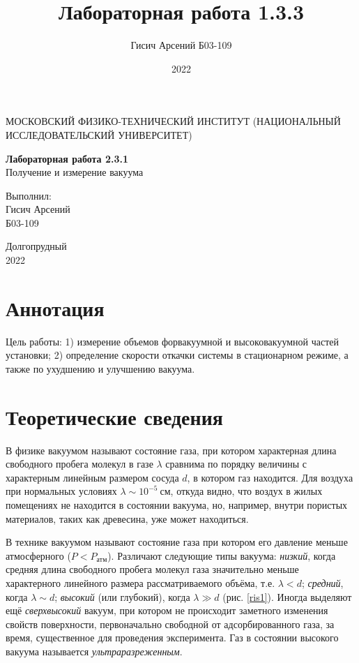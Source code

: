 \documentclass[a4paper, 12pt]{article}
\title{Лабораторная работа 1.3.3}
\author{Гисич Арсений Б03-109}
\date{2022}
\begin{document}
	\begin{center}
		{\large МОСКОВСКИЙ ФИЗИКО-ТЕХНИЧЕСКИЙ ИНСТИТУТ (НАЦИОНАЛЬНЫЙ ИССЛЕДОВАТЕЛЬСКИЙ УНИВЕРСИТЕТ)}
	\end{center}
	\vspace{5 cm}
	{\Large
		\begin{center}
			{\bf Лабораторная работа 2.3.1}\\[0.2 cm]
			Получение и измерение вакуума
		\end{center}
	}
	\vspace{4 cm}
	\begin{flushright}
		{\Large Выполнил: \\
			\vspace{0.2 cm}
			Гисич Арсений \\
			\vspace{0.2 cm}
			Б03-109 \\}
	\end{flushright}
	\vspace{9 cm}
	\begin{center}
		Долгопрудный\\[0.1 cm]
		2022
	\end{center}
\thispagestyle{empty}

\section{Аннотация}

\par Цель работы: 1) измерение объемов форвакуумной и высоковакуумной частей установки; 2) определение скорости откачки системы в стационарном режиме, а также по ухудшению и улучшению вакуума.

\section{Теоретические сведения}

В физике вакуумом называют состояние газа, при котором характерная длина свободного пробега молекул в газе $\lambda$ сравнима по порядку
величины с характерным линейным размером сосуда $d$, в котором газ
находится. Для воздуха при нормальных условиях $\lambda \sim 10^{-5}~см$, откуда
видно, что воздух в жилых помещениях не находится в состоянии вакуума, но, например, внутри пористых материалов, таких как древесина, уже
может находиться.

В технике вакуумом называют состояние газа при котором его
давление меньше атмосферного ($P < P_{атм}$). Различают следующие типы
вакуума: \textit{низкий}, когда средняя длина свободного пробега молекул газа
значительно меньше характерного линейного размера рассматриваемого
объёма, т.е. $\lambda < d$; \textit{средний}, когда $\lambda \sim d$; \textit{высокий} (или глубокий), когда
$\lambda \gg d$ (рис. \ref{ris1}). Иногда выделяют ещё \textit{сверхвысокий} вакуум, при котором
не происходит заметного изменения свойств поверхности, первоначально
свободной от адсорбированного газа, за время, существенное
для проведения эксперимента. Газ в состоянии высокого вакуума называется \textit{ультраразреженным}.
\end{document}
